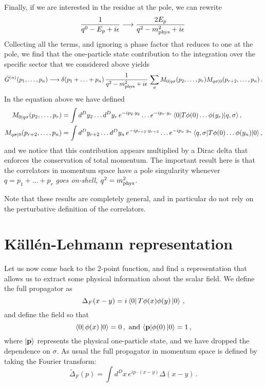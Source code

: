 \documentclass[notes]{subfiles}
\begin{document}
Finally, if we are interested in the residue at the pole, we can rewrite
\begin{align}
  \frac{1}{q^0-E_p + i\epsilon} \longrightarrow \frac{2 E_p}{q^2-m_\mathrm{phys}^2 + i\epsilon}\, 
\end{align}
Collecting all the terms, and ignoring a phase factor that reduces to
one at the pole, we find that the one-particle state contribution to the
integration over the specific sector that we considered above yields
\begin{align}
  \tilde{G}^{(n)}(p_1,\ldots,p_n) \longrightarrow
  \delta(p_1+\ldots+p_n)\, \frac{1}{q^2-m_\mathrm{phys}^2+i\epsilon}\, 
  \sum_\sigma M_{0|q\sigma}(p_2,\ldots,p_r) M_{q\sigma|0}(p_{r+2},
  \ldots, p_n)\, .
\end{align}
In the equation above we have defined
\begin{align}
  M_{0|q\sigma}(p_2,\ldots,p_r) 
  &= \int d^Dy_2 \ldots d^Dy_r\, 
    e^{-ip_2\cdot y_2} \ldots e^{-ip_r\cdot y_r}
    \mel{0}{T \phi(0) \ldots \phi(y_r)}{q,\sigma}, \\
 M_{q\sigma|0}(p_{r+2},\ldots, p_n) 
  &= \int d^Dy_{r+2} \ldots d^Dy_n\, 
    e^{-ip_{r+2}\cdot y_{r+2}} \ldots e^{-ip_n\cdot y_n}
    \mel{q,\sigma}{  T \phi(0) \ldots \phi(y_n)}{0},
\end{align}
and we notice that this contribution appears multiplied by a Dirac
delta that enforces the conservation of total momentum. The important
result here is that the correlators in momentum space have a pole
singularity whenever $q=p_1+\ldots+p_r$ \emph{goes on-shell}, \ie
$q^2=m_\mathrm{phys}^2$.

Note that these results are completely general, and in particular do
not rely on the perturbative definition of the correlators. 

\section{Källén-Lehmann representation}
\label{sec:kall-lehm-repr}

Let us now come back to the 2-point function, and find a representation
that allows us to extract some physical information about the scalar
field. We define the full propagator as
\begin{equation}
  \label{eq:FullProp}
  \Delta_F(x-y) = i \bra{0} T \phi(x) \phi(y) \ket{0} \, ,
\end{equation}
and define the field so that
\begin{equation}
  \label{eq:FieldNorm}
  \bra{0} \phi(x) \ket{0} = 0\, ,\ \mathrm{and}\
  \langle \mathbf{p}| \phi(0) \ket{0} = 1\, ,
\end{equation}
where $\ket{\mathbf{p}}$ represents the physical one-particle state,
and we have dropped the dependence on $\sigma$. As usual the full
propagator in momentum space is defined by taking the Fourier
transform:
\begin{equation}
  \label{eq:FullPropMom}
  \tilde{\Delta}_F(p) = 
  \int d^Dx\,  e^{ip\cdot(x-y)} \Delta(x-y)\, .
\end{equation}
\end{document}
